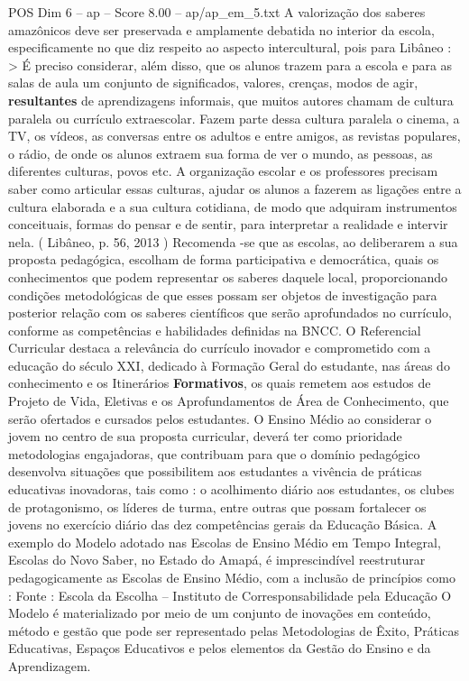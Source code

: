 \begin{textsample}{POS Dim 6 – ap – Score 8.00 – ap/ap\_em\_5.txt}
A valorização dos saberes amazônicos deve ser preservada e amplamente debatida no interior da escola, especificamente no que diz respeito ao aspecto intercultural, pois para Libâneo : > É preciso considerar, além disso, que os alunos trazem para a escola e para as salas de aula um conjunto de significados, valores, crenças, modos de agir, \textbf{resultantes} de aprendizagens informais, que muitos autores chamam de cultura paralela ou currículo extraescolar.
Fazem parte dessa cultura paralela o cinema, a TV, os vídeos, as conversas entre os adultos e entre amigos, as revistas populares, o rádio, de onde os alunos extraem sua forma de ver o mundo, as pessoas, as diferentes culturas, povos etc.
A organização escolar e os professores precisam saber como articular essas culturas, ajudar os alunos a fazerem as ligações entre a cultura elaborada e a sua cultura cotidiana, de modo que adquiram instrumentos conceituais, formas do pensar e de sentir, para interpretar a realidade e intervir nela. ( Libâneo, p. 56, 2013 ) Recomenda -se que as escolas, ao deliberarem a sua proposta pedagógica, escolham de forma participativa e democrática, quais os conhecimentos que podem representar os saberes daquele local, proporcionando condições metodológicas de que esses possam ser objetos de investigação para posterior relação com os saberes científicos que serão aprofundados no currículo, conforme as competências e habilidades definidas na BNCC.
O Referencial Curricular destaca a relevância do currículo inovador e comprometido com a educação do século XXI, dedicado à Formação Geral do estudante, nas áreas do conhecimento e os Itinerários \textbf{Formativos}, os quais remetem aos estudos de Projeto de Vida, Eletivas e os Aprofundamentos de Área de Conhecimento, que serão ofertados e cursados pelos estudantes.
O Ensino Médio ao considerar o jovem no centro de sua proposta curricular, deverá ter como prioridade metodologias engajadoras, que contribuam para que o domínio pedagógico desenvolva situações que possibilitem aos estudantes a vivência de práticas educativas inovadoras, tais como : o acolhimento diário aos estudantes, os clubes de protagonismo, os líderes de turma, entre outras que possam fortalecer os jovens no exercício diário das dez competências gerais da Educação Básica.
A exemplo do Modelo adotado nas Escolas de Ensino Médio em Tempo Integral, Escolas do Novo Saber, no Estado do Amapá, é imprescindível reestruturar pedagogicamente as Escolas de Ensino Médio, com a inclusão de princípios como : Fonte : Escola da Escolha – Instituto de Corresponsabilidade pela Educação O Modelo é materializado por meio de um conjunto de inovações em conteúdo, método e gestão que pode ser representado pelas Metodologias de Êxito, Práticas Educativas, Espaços Educativos e pelos elementos da Gestão do Ensino e da Aprendizagem.

\end{textsample}
